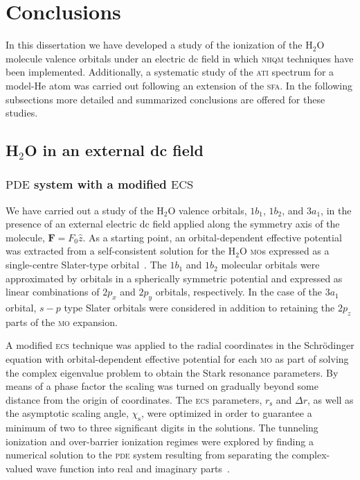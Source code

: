 \chapter{Conclusions}
\label{ch:conclusions}

In this dissertation we have developed a study of the ionization of
the H$_{2}$O molecule valence orbitals under an electric dc field in
which \textsc{nhqm} techniques have been implemented. Additionally, a
systematic study of the \textsc{ati} spectrum for a model-He atom was
carried out following an extension of the \textsc{sfa}. In the
following subsections more detailed and summarized conclusions are
offered for these studies.

\section{H$_{2}$O in an external dc field}
\label{ch:h2o_results}

\subsection*{$\mathrm{PDE}$ system with a modified $\mathrm{ECS}$}



We have carried out a study of the H$_{2}$O valence orbitals,
$1b_{1}$, $1b_{2}$, and $3a_{1}$, in the presence of an external
electric dc field applied along the symmetry axis of the molecule,
$\mathbf{F} = F_{0}\hat{z}$. As a starting point, an orbital-dependent
effective potential was extracted from a self-consistent solution for
the H$_{2}$O \textsc{mo}s expressed as a single-centre Slater-type
orbital~\cite{Moccia_1964}. The $1b_{1}$ and $1b_{2}$ molecular
orbitals were approximated by orbitals in a spherically symmetric
potential and expressed as linear combinations of $2p_{x}$ and
$2p_{y}$ orbitals, respectively. In the case of the $3a_{1}$ orbital,
$s-p$ type Slater orbitals were considered in addition to retaining
the $2p_{z}$ parts of the \textsc{mo} expansion.

A modified \textsc{ecs} technique was applied to the radial
coordinates in the Schr\"{o}dinger equation with orbital-dependent
effective potential for each \textsc{mo} as part of solving the
complex eigenvalue problem to obtain the Stark resonance
parameters. By means of a phase factor the scaling was turned on
gradually beyond some distance from the origin of coordinates. The
\textsc{ecs} parameters, $r_{\mathrm{s}}$ and $\Delta r$, as well as
the asymptotic scaling angle, $\chi_{\mathrm{s}}$, were optimized in
order to guarantee a minimum of two to three significant digits in the
solutions. The tunneling ionization and over-barrier ionization
regimes were explored by finding a numerical solution to the
\textsc{pde} system resulting from separating the complex-valued wave
function into real and imaginary parts~\cite{sarias_2016,sarias_2017}.


